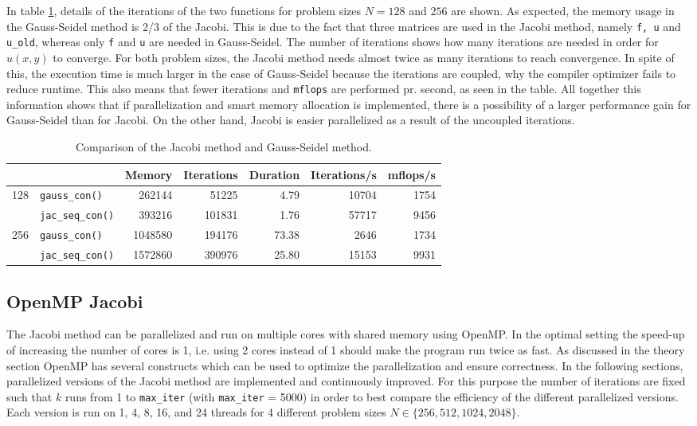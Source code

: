 In table \ref{tab:seq_par}, details of the iterations of the two functions for problem sizes $N = 128$ and $256$ are shown. As expected, the memory usage in the Gauss-Seidel method is 2/3 of the Jacobi. This is due to the fact that three matrices are used in the Jacobi method, namely \texttt{f, u} and \texttt{u\_old}, whereas only \texttt{f} and \texttt{u} are needed in Gauss-Seidel. The number of iterations shows how many iterations are needed in order for $u(x,y)$ to converge. For both problem sizes, the Jacobi method needs almost twice as many iterations to reach convergence. In spite of this, the execution time is much larger in the case of Gauss-Seidel because the iterations are coupled, why the compiler optimizer fails to reduce runtime. This also means that fewer iterations and \texttt{mflops} are performed pr. second, as seen in the table. All together this information shows that if parallelization and smart memory allocation is implemented, there is a possibility of a larger performance gain for Gauss-Seidel than for Jacobi. On the other hand, Jacobi is easier parallelized as a result of the uncoupled iterations. 

\begin{table}[!th]
\centering
\begin{tabular}{ll|rrrrr}
&& Memory & Iterations & Duration & Iterations/s & mflops/s \\ \hline
\multirow{2}{*}{128}&\texttt{gauss\_con()}&262144&51225&4.79&10704&1754\\
&\texttt{jac\_seq\_con()}&393216&101831&1.76&57717&9456\\\hline
\multirow{2}{*}{256}&\texttt{gauss\_con()}&1048580&194176&73.38&2646&1734\\
&\texttt{jac\_seq\_con()}&1572860&390976&25.80&15153&9931\\
\end{tabular}
\caption{Comparison of the Jacobi method and Gauss-Seidel method.}
\label{tab:seq_par}
\end{table}

\subsection{OpenMP Jacobi}

The Jacobi method can be parallelized and run on multiple cores with shared memory using OpenMP. In the optimal setting the speed-up of increasing the number of cores is 1, i.e. using 2 cores instead of 1 should make the program run twice as fast. As discussed in the theory section OpenMP has several constructs which can be used to optimize the parallelization and ensure correctness. In the following sections, parallelized versions of the Jacobi method are implemented and continuously improved. For this purpose the number of iterations are fixed such that $k$ runs from 1 to \texttt{max\_iter} (with \texttt{max\_iter} = 5000) in order to best compare the efficiency of the different parallelized versions. Each version is run on 1, 4, 8, 16, and 24 threads for 4 different problem sizes $N \in \{256, 512, 1024, 2048\}$.

